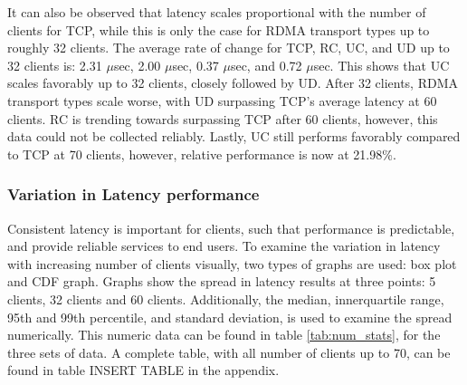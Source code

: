 It can also be observed that latency scales proportional with the number of clients for TCP, while this is only the case for RDMA transport types up to roughly 32 clients.
The average rate of change for TCP, RC, UC, and UD up to 32 clients is: 2.31 $\mu$sec, 2.00 $\mu$sec, 0.37 $\mu$sec, and 0.72 $\mu$sec.
This shows that UC scales favorably up to 32 clients, closely followed by UD.
After 32 clients, RDMA transport types scale worse, with UD surpassing TCP's average latency at 60 clients.
RC is trending towards surpassing TCP after 60 clients, however, this data could not be collected reliably.
Lastly, UC still performs favorably compared to TCP at 70 clients, however, relative performance is now at 21.98\%.

\subsubsection{Variation in Latency performance}
Consistent latency is important for clients, such that performance is predictable, and provide reliable services to end users.
To examine the variation in latency with increasing number of clients visually, two types of graphs are used: box plot and CDF graph.
Graphs show the spread in latency results at three points: 5 clients, 32 clients and 60 clients.
Additionally, the median, innerquartile range, 95th and 99th percentile, and standard deviation, is used to examine the spread numerically.
This numeric data can be found in table \ref{tab:num_stats}, for the three sets of data.
A complete table, with all number of clients up to 70, can be found in table INSERT TABLE in the appendix.
